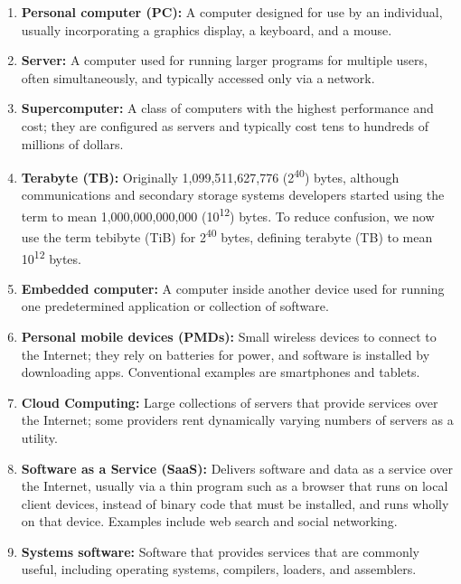 
\begin{enumerate}
    \item \textbf{Personal computer (PC):} A computer designed for use by an individual, usually incorporating a graphics display, a keyboard, and a mouse.
    
    \item \textbf{Server:} A computer used for running larger programs for multiple users, often simultaneously, and typically accessed only via a network.
    
    \item \textbf{Supercomputer:} A class of computers with the highest performance and cost; they are configured as servers and typically cost tens to hundreds of millions of dollars.
    
    \item \textbf{Terabyte (TB):} Originally 1,099,511,627,776 (2\textsuperscript{40}) bytes, although communications and secondary storage systems developers started using the term to mean 1,000,000,000,000 (10\textsuperscript{12}) bytes. To reduce confusion, we now use the term tebibyte (TiB) for 2\textsuperscript{40} bytes, defining terabyte (TB) to mean 10\textsuperscript{12} bytes. 
    
    \item \textbf{Embedded computer:} A computer inside another device used for running one predetermined application or collection of software.
    
    \item \textbf{Personal mobile devices (PMDs):} Small wireless devices to connect to the Internet; they rely on batteries for power, and software is installed by downloading apps. Conventional examples are smartphones and tablets.
    
    \item \textbf{Cloud Computing:} Large collections of servers that provide services over the Internet; some providers rent dynamically varying numbers of servers as a utility.
    
    \item \textbf{Software as a Service (SaaS):} Delivers software and data as a service over the Internet, usually via a thin program such as a browser that runs on local client devices, instead of binary code that must be installed, and runs wholly on that device. Examples include web search and social networking.
    
    \item \textbf{Systems software:} Software that provides services that are commonly useful, including operating systems, compilers, loaders, and assemblers.
    

\end{enumerate}
